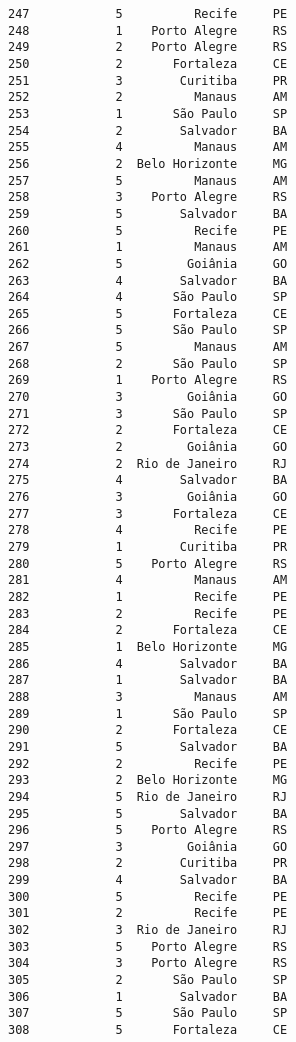 \documentclass[11pt]{article}
\begin{document}
\begin{Verbatim}[commandchars=\\\{\}]
247            5          Recife     PE  
248            1    Porto Alegre     RS  
249            2    Porto Alegre     RS  
250            2       Fortaleza     CE  
251            3        Curitiba     PR  
252            2          Manaus     AM  
253            1       São Paulo     SP  
254            2        Salvador     BA  
255            4          Manaus     AM  
256            2  Belo Horizonte     MG  
257            5          Manaus     AM  
258            3    Porto Alegre     RS  
259            5        Salvador     BA  
260            5          Recife     PE  
261            1          Manaus     AM  
262            5         Goiânia     GO  
263            4        Salvador     BA  
264            4       São Paulo     SP  
265            5       Fortaleza     CE  
266            5       São Paulo     SP  
267            5          Manaus     AM  
268            2       São Paulo     SP  
269            1    Porto Alegre     RS  
270            3         Goiânia     GO  
271            3       São Paulo     SP  
272            2       Fortaleza     CE  
273            2         Goiânia     GO  
274            2  Rio de Janeiro     RJ  
275            4        Salvador     BA  
276            3         Goiânia     GO  
277            3       Fortaleza     CE  
278            4          Recife     PE  
279            1        Curitiba     PR  
280            5    Porto Alegre     RS  
281            4          Manaus     AM  
282            1          Recife     PE  
283            2          Recife     PE  
284            2       Fortaleza     CE  
285            1  Belo Horizonte     MG  
286            4        Salvador     BA  
287            1        Salvador     BA  
288            3          Manaus     AM  
289            1       São Paulo     SP  
290            2       Fortaleza     CE  
291            5        Salvador     BA  
292            2          Recife     PE  
293            2  Belo Horizonte     MG  
294            5  Rio de Janeiro     RJ  
295            5        Salvador     BA  
296            5    Porto Alegre     RS  
297            3         Goiânia     GO  
298            2        Curitiba     PR  
299            4        Salvador     BA  
300            5          Recife     PE  
301            2          Recife     PE  
302            3  Rio de Janeiro     RJ  
303            5    Porto Alegre     RS  
304            3    Porto Alegre     RS  
305            2       São Paulo     SP  
306            1        Salvador     BA  
307            5       São Paulo     SP  
308            5       Fortaleza     CE  

\end{Verbatim}
\end{document}
